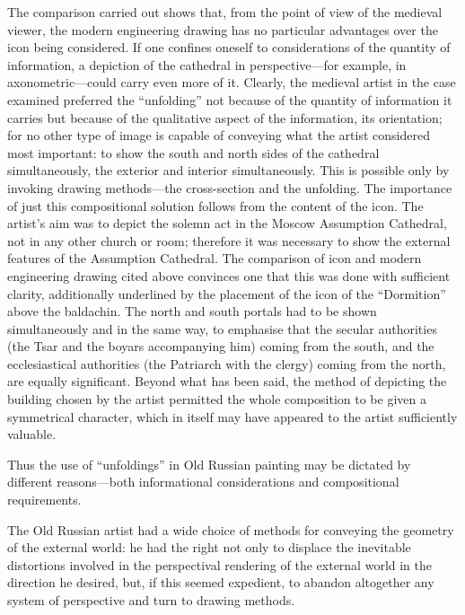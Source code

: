 The comparison carried out shows that, from the point of view of the medieval viewer, the
modern engineering drawing has no particular advantages over the icon being considered.
If one confines oneself to considerations of the quantity of information, a depiction of
the cathedral in perspective---for example, in axonometric---could carry even more of it.
Clearly, the medieval artist in the case examined preferred the ``unfolding'' not because
of the quantity of information it carries but because of the qualitative aspect of the
information, its orientation; for no other type of image is capable of conveying what the
artist considered most important: to show the south and north sides of the cathedral
simultaneously, the exterior and interior simultaneously.  This is possible only by
invoking drawing methods---the cross-section and the unfolding.  The importance of just
this compositional solution follows from the content of the icon.  The artist's aim was
to depict the solemn act in the Moscow Assumption Cathedral, not in any other church or
room; therefore it was necessary to show the external features of the Assumption Cathedral.
The comparison of icon and modern engineering drawing cited above convinces one that this
was done with sufficient clarity, additionally underlined by the placement of the icon of
the ``Dormition'' above the baldachin.  The north and south portals had to be shown
simultaneously and in the same way, to emphasise that the secular authorities (the Tsar
and the boyars accompanying him) coming from the south, and the ecclesiastical authorities
(the Patriarch with the clergy) coming from the north, are equally significant.  Beyond
what has been said, the method of depicting the building chosen by the artist permitted
the whole composition to be given a symmetrical character, which in itself may have
appeared to the artist sufficiently valuable.

Thus the use of ``unfoldings'' in Old Russian painting may be dictated by different
reasons---both informational considerations and compositional requirements.


The Old Russian artist had a wide choice of methods for conveying the geometry of the
external world: he had the right not only to displace the inevitable distortions involved
in the perspectival rendering of the external world in the direction he desired, but, if
this seemed expedient, to abandon altogether any system of perspective and turn to drawing
methods.

